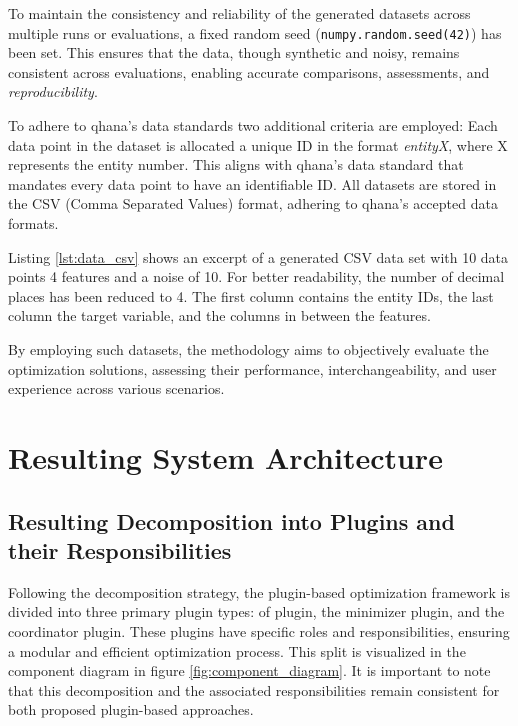 \documentclass[
  a4paper,  %
  twoside,  %
  bibliography=totoc,
  headsepline,
  cleardoublepage=empty,
  parskip=half,
  draft=false
]{scrbook}
\begin{document}
To maintain the consistency and reliability of the generated datasets across multiple runs or evaluations, a fixed random seed (\texttt{numpy.random.seed(42)}) has been set.
This ensures that the data, though synthetic and noisy, remains consistent across evaluations, enabling accurate comparisons, assessments, and \emph{reproducibility}.

To adhere to \gls{qhana}'s data standards two additional criteria are employed:
Each data point in the dataset is allocated a unique ID in the format \emph{entityX}, where X represents the entity number.
This aligns with \gls{qhana}'s data standard that mandates every data point to have an identifiable ID.
All datasets are stored in the CSV (Comma Separated Values) format, adhering to \gls{qhana}'s accepted data formats.

Listing \ref{lst:data_csv} shows an excerpt of a generated CSV data set with 10 data points 4 features and a noise of 10.
For better readability, the number of decimal places has been reduced to 4.
The first column contains the entity IDs, the last column the target variable, and the columns in between the features.

\begin{center}

\end{center}



By employing such datasets, the methodology aims to objectively evaluate the optimization solutions, assessing their performance, interchangeability, and user experience across various scenarios.



\chapter{Resulting System Architecture}
\label{chap:architecture}


\section{Resulting Decomposition into Plugins and their Responsibilities}
\label{sec:resdecomposition}

Following the decomposition strategy, the plugin-based optimization framework is divided into three primary plugin types:
\gls{of} plugin, the minimizer plugin, and the coordinator plugin.
These plugins have specific roles and responsibilities, ensuring a modular and efficient optimization process.
This split is visualized in the component diagram in figure \ref{fig:component_diagram}.
It is important to note that this decomposition and the associated responsibilities remain consistent for both proposed plugin-based approaches.
\end{document}
